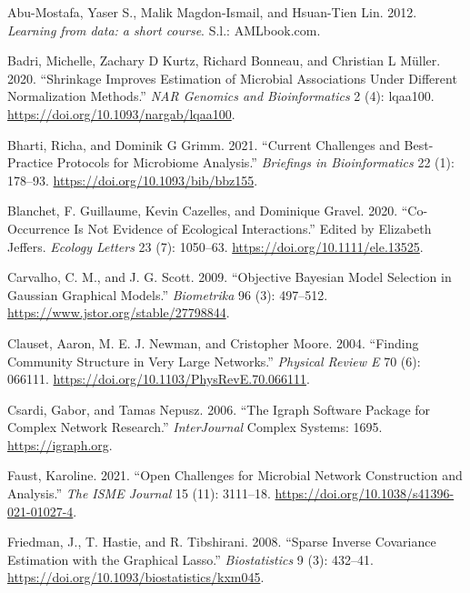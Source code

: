 \documentclass[
  a4paper,
]{article}
\newlength{\cslhangindent}
\newlength{\cslentryspacingunit} %
\newenvironment{CSLReferences}[2] %
 {%
  \setlength{\parindent}{0pt}
  \ifodd #1
  \let\oldpar\par
  \def\par{\hangindent=\cslhangindent\oldpar}
  \fi
  \setlength{\parskip}{#2\cslentryspacingunit}
 }%
 {}
\begin{document}
\hypertarget{refs}{}
\begin{CSLReferences}{1}{0}
\leavevmode{}%
Abu-Mostafa, Yaser S., Malik Magdon-Ismail, and Hsuan-Tien Lin. 2012.
\emph{Learning from data: a short course}. S.l.: AMLbook.com.

\leavevmode{}%
Badri, Michelle, Zachary D Kurtz, Richard Bonneau, and Christian L
Müller. 2020. {``Shrinkage Improves Estimation of Microbial Associations
Under Different Normalization Methods.''} \emph{NAR Genomics and
Bioinformatics} 2 (4): lqaa100.
\url{https://doi.org/10.1093/nargab/lqaa100}.

\leavevmode{}%
Bharti, Richa, and Dominik G Grimm. 2021. {``Current Challenges and
Best-Practice Protocols for Microbiome Analysis.''} \emph{Briefings in
Bioinformatics} 22 (1): 178--93.
\url{https://doi.org/10.1093/bib/bbz155}.

\leavevmode{}%
Blanchet, F. Guillaume, Kevin Cazelles, and Dominique Gravel. 2020.
{``Co{-}Occurrence Is Not Evidence of Ecological Interactions.''} Edited
by Elizabeth Jeffers. \emph{Ecology Letters} 23 (7): 1050--63.
\url{https://doi.org/10.1111/ele.13525}.

\leavevmode{}%
Carvalho, C. M., and J. G. Scott. 2009. {``Objective Bayesian Model
Selection in Gaussian Graphical Models.''} \emph{Biometrika} 96 (3):
497--512. \url{https://www.jstor.org/stable/27798844}.

\leavevmode{}%
Clauset, Aaron, M. E. J. Newman, and Cristopher Moore. 2004. {``Finding
Community Structure in Very Large Networks.''} \emph{Physical Review E}
70 (6): 066111. \url{https://doi.org/10.1103/PhysRevE.70.066111}.

\leavevmode{}%
Csardi, Gabor, and Tamas Nepusz. 2006. {``The Igraph Software Package
for Complex Network Research.''} \emph{InterJournal} Complex Systems:
1695. \url{https://igraph.org}.

\leavevmode{}%
Faust, Karoline. 2021. {``Open Challenges for Microbial Network
Construction and Analysis.''} \emph{The ISME Journal} 15 (11): 3111--18.
\url{https://doi.org/10.1038/s41396-021-01027-4}.

\leavevmode{}%
Friedman, J., T. Hastie, and R. Tibshirani. 2008. {``Sparse Inverse
Covariance Estimation with the Graphical Lasso.''} \emph{Biostatistics}
9 (3): 432--41. \url{https://doi.org/10.1093/biostatistics/kxm045}.


\end{CSLReferences}
\end{document}
